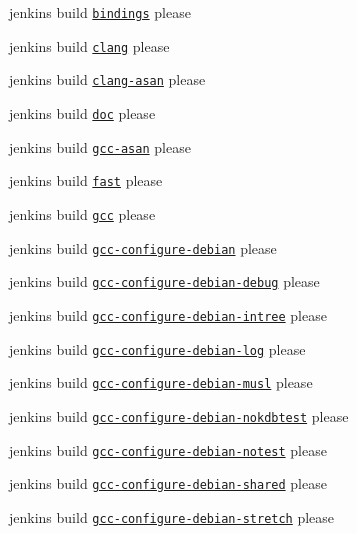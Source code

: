 \begin{DoxyItemize}
\item jenkins build \href{https://build.libelektra.org/job/elektra-test-bindings/}{\tt bindings} please
\item jenkins build \href{https://build.libelektra.org/job/elektra-clang/}{\tt clang} please
\item jenkins build \href{https://build.libelektra.org/job/elektra-clang-asan/}{\tt clang-\/asan} please
\item jenkins build \href{https://build.libelektra.org/jenkins/job/elektra-doc/}{\tt doc} please
\item jenkins build \href{https://build.libelektra.org/job/elektra-gcc-asan/}{\tt gcc-\/asan} please
\item jenkins build \href{https://build.libelektra.org/job/elektra-mergerequests-fast/}{\tt fast} please
\item jenkins build \href{https://build.libelektra.org/job/elektra-gcc/}{\tt gcc} please
\item jenkins build \href{https://build.libelektra.org/job/elektra-gcc-configure-debian/}{\tt gcc-\/configure-\/debian} please
\item jenkins build \href{https://build.libelektra.org/job/elektra-gcc-configure-debian-debug}{\tt gcc-\/configure-\/debian-\/debug} please
\item jenkins build \href{https://build.libelektra.org/job/elektra-gcc-configure-debian-intree/}{\tt gcc-\/configure-\/debian-\/intree} please
\item jenkins build \href{https://build.libelektra.org/job/elektra-gcc-configure-debian-log}{\tt gcc-\/configure-\/debian-\/log} please
\item jenkins build \href{https://build.libelektra.org/job/elektra-gcc-configure-debian-musl/}{\tt gcc-\/configure-\/debian-\/musl} please
\item jenkins build \href{https://build.libelektra.org/job/elektra-gcc-configure-debian-nokdbtest/}{\tt gcc-\/configure-\/debian-\/nokdbtest} please
\item jenkins build \href{https://build.libelektra.org/job/elektra-gcc-configure-debian-notest/}{\tt gcc-\/configure-\/debian-\/notest} please
\item jenkins build \href{https://build.libelektra.org/job/elektra-gcc-configure-debian-shared/}{\tt gcc-\/configure-\/debian-\/shared} please
\item jenkins build \href{https://build.libelektra.org/job/elektra-gcc-configure-debian-stretch/}{\tt gcc-\/configure-\/debian-\/stretch} please

\end{DoxyItemize}
